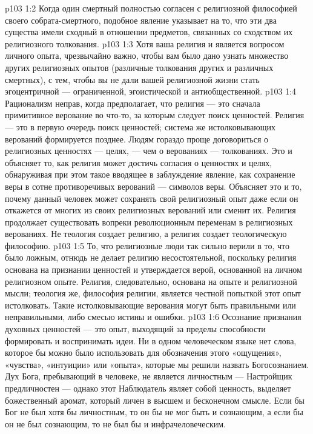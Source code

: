\vs p103 1:2 Когда один смертный полностью согласен с религиозной философией своего собрата\hyp{}смертного, подобное явление указывает на то, что эти два существа имели сходный  в отношении предметов, связанных со сходством их религиозного толкования.
\vs p103 1:3 Хотя ваша религия и является вопросом личного опыта, чрезвычайно важно, чтобы вам было дано узнать множество других религиозных опытов (различные толкования других и различных смертных), с тем, чтобы вы не дали вашей религиозной жизни стать эгоцентричной --- ограниченной, эгоистической и антиобщественной.
\vs p103 1:4 Рационализм неправ, когда предполагает, что религия --- это сначала примитивное верование во что\hyp{}то, за которым следует поиск ценностей. Религия --- это в первую очередь поиск ценностей; система же истолковывающих верований формируется позднее. Людям гораздо проще договориться о религиозных ценностях --- целях, --- чем о верованиях --- толкованиях. Это и объясняет то, как религия может достичь согласия о ценностях и целях, обнаруживая при этом такое вводящее в заблуждение явление, как сохранение веры в сотне противоречивых верований --- символов веры. Объясняет это и то, почему данный человек может сохранять свой религиозный опыт даже если он откажется от многих из своих религиозных верований или сменит их. Религия продолжает существовать вопреки революционным переменам в религиозных верованиях. Не теология создает религию, а религия создает теологическую философию.
\vs p103 1:5 То, что религиозные люди так сильно верили в то, что было ложным, отнюдь не делает религию несостоятельной, поскольку религия основана на признании ценностей и утверждается верой, основанной на личном религиозном опыте. Религия, следовательно, основана на опыте и религиозной мысли; теология же, философия религии, является честной попыткой этот опыт истолковать. Такие истолковывающие верования могут быть правильными или неправильными, либо смесью истины и ошибки.
\vs p103 1:6 Осознание признания духовных ценностей --- это опыт, выходящий за пределы способности формировать и воспринимать идеи. Ни в одном человеческом языке нет слова, которое бы можно было использовать для обозначения этого «ощущения», «чувства», «интуиции» или «опыта», которые мы решили назвать Богосознанием. Дух Бога, пребывающий в человеке, не является личностным --- Настройщик предличностен --- однако этот Наблюдатель являет собой ценность, выделяет божественный аромат, который личен в высшем и бесконечном смысле. Если бы Бог не был хотя бы личностным, то он бы не мог быть и сознающим, а если бы он не был сознающим, то не был бы и инфрачеловеческим.
